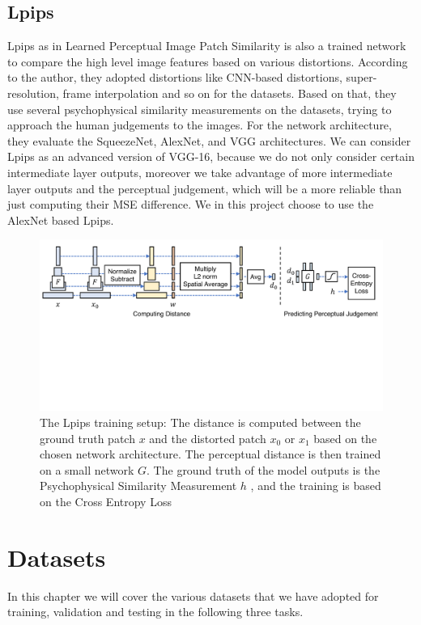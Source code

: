 \documentclass[a4paper,12pt,twoside]{report}
\begin{document}
\section{Lpips}
Lpips as in Learned Perceptual Image Patch Similarity\cite{zhang2018perceptual} is also a trained network to compare the high level image features based on various distortions. According to the author, they adopted distortions like CNN-based distortions, super-resolution, frame interpolation and so on for the datasets. Based on that, they use several psychophysical similarity measurements on the datasets, trying to approach the human judgements to the images. For the network architecture, they evaluate the SqueezeNet, AlexNet, and VGG architectures. We can consider Lpips as an advanced version of VGG-16, because we do not only consider certain intermediate layer outputs, moreover we take advantage of more intermediate layer outputs and the perceptual judgement, which will be a more reliable than just computing their MSE difference. We in this project choose to use the AlexNet based Lpips.
\begin{figure}
\centering
\includegraphics[width=1.0\textwidth]{network_lpips.pdf}
\caption{The Lpips training setup: The distance is computed between the ground truth patch $x$ and the distorted patch $x_0$ or $x_1$ based on the chosen network architecture. The perceptual distance is then trained on a small network $G$. The ground truth of the model outputs is the Psychophysical Similarity Measurement $h$ , and the training is based on the Cross Entropy Loss\cite{zhang2018perceptual}}
\end{figure}







\chapter{Datasets}
In this chapter we will cover the various datasets that we have adopted for training, validation and testing in the following three tasks.
\end{document}

